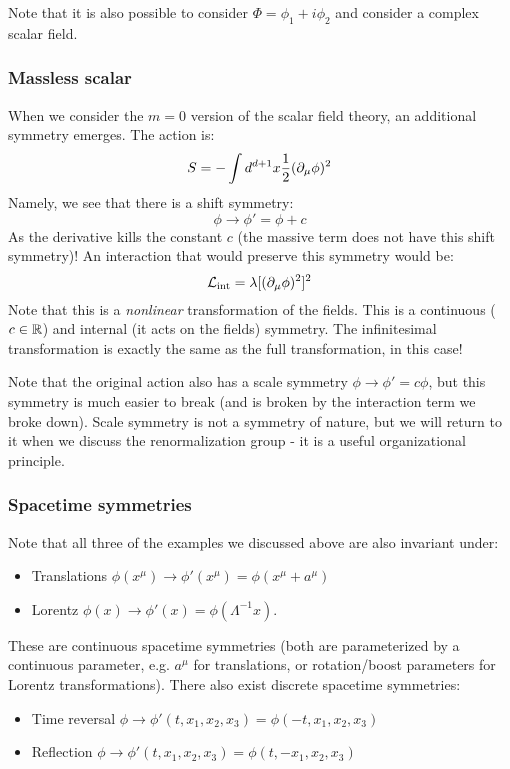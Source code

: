 Note that it is also possible to consider $\Phi = \phi_1 + i\phi_2$ and consider a complex scalar field.

\subsubsection*{Massless scalar}
When we consider the $m=0$ version of the scalar field theory, an additional symmetry emerges. The action is:
\begin{equation}
    S = -\int d^{d+1}x \frac{1}{2}(\partial_\mu \phi)^2
\end{equation}
Namely, we see that there is a shift symmetry:
\begin{equation}
    \phi \to \phi' = \phi + c
\end{equation}
As the derivative kills the constant $c$ (the massive term does not have this shift symmetry)! An interaction that would preserve this symmetry would be:
\begin{equation}
    \mathcal{L}_{\text{int}} = \lambda[(\partial_\mu \phi)^2]^2
\end{equation}
Note that this is a \emph{nonlinear} transformation of the fields. This is a continuous ($c \in \mathbb{R}$) and internal (it acts on the fields) symmetry. The infinitesimal transformation is exactly the same as the full transformation, in this case!

Note that the original action also has a scale symmetry $\phi \to \phi' = c\phi$, but this symmetry is much easier to break (and is broken by the interaction term we broke down). Scale symmetry is not a symmetry of nature, but we will return to it when we discuss the renormalization group - it is a useful organizational principle.

\subsubsection*{Spacetime symmetries}
Note that all three of the examples we discussed above are also invariant under:
\begin{itemize}
    \item Translations $\phi(x^\mu) \to \phi'(x^\mu) = \phi(x^\mu + a^\mu)$
    \item Lorentz $\phi(x) \to \phi'(x) = \phi(\Lambda^{-1}x)$.
\end{itemize}
These are continuous spacetime symmetries (both are parameterized by a continuous parameter, e.g. $a^\mu$ for translations, or rotation/boost parameters for Lorentz transformations). There also exist discrete spacetime symmetries:
\begin{itemize}
    \item Time reversal $\phi \to \phi'(t, x_1, x_2, x_3) = \phi(-t, x_1, x_2, x_3)$
    \item Reflection $\phi \to \phi'(t, x_1, x_2, x_3) = \phi(t, -x_1, x_2, x_3)$
\end{itemize}

